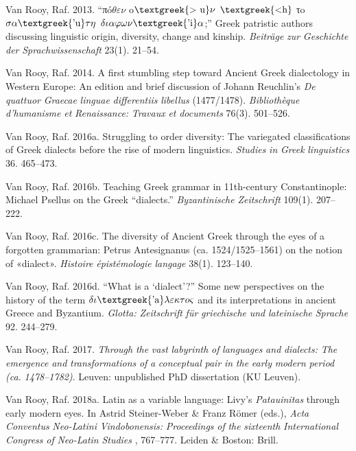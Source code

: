 Van Rooy, Raf. 2013. “πó$\theta \varepsilon \nu $ o$\text{\textgreek{>~u}}\nu $ $\text{\textgreek{<h}}$ τo$\sigma \alpha \text{\textgreek{'u}}\tau \eta $ $\delta \iota \alpha \varphi \omega \nu \text{\textgreek{'i}}\alpha $;” Greek patristic authors discussing linguistic origin, diversity, change and kinship. \textit{Beiträge} \textit{zur} \textit{Geschichte} \textit{der} \textit{Sprachwissenschaft} 23(1). 21–54.

Van Rooy, Raf. 2014. A first stumbling step toward Ancient Greek dialectology in Western Europe: An edition and brief discussion of Johann Reuchlin’s \textit{De} \textit{quattuor} \textit{Graecae} \textit{linguae} \textit{differentiis} \textit{libellus} (1477/1478). \textit{Bibliothèque} \textit{d’humanisme} \textit{et} \textit{Renaissance:} \textit{Travaux} \textit{et} \textit{documents} 76(3). 501–526.

Van Rooy, Raf. 2016a. Struggling to order diversity: The variegated classifications of Greek dialects before the rise of modern linguistics. \textit{Studies} \textit{in} \textit{Greek} \textit{linguistics} 36. 465–473.

Van Rooy, Raf. 2016b. Teaching Greek grammar in 11th-century Constantinople: Michael Psellus on the Greek “dialects.” \textit{Byzantinische} \textit{Zeitschrift} 109(1). 207–222.

Van Rooy, Raf. 2016c. The diversity of Ancient Greek through the eyes of a forgotten grammarian: Petrus Antesignanus (ca. 1524/1525–1561) on the notion of «dialect». \textit{Histoire} \textit{épistémologie} \textit{langage} 38(1). 123–140.

Van Rooy, Raf. 2016d. “What is a ‘dialect’?” Some new perspectives on the history of the term $\delta \iota \text{\textgreek{'a}}\lambda \varepsilon \kappa \tau o\varsigma $ and its interpretations in ancient Greece and Byzantium. \textit{Glotta:} \textit{Zeitschrift} \textit{für} \textit{griechische} \textit{und} \textit{lateinische} \textit{Sprache} 92. 244–279.

Van Rooy, Raf. 2017. \textit{Through} \textit{the} \textit{vast} \textit{labyrinth} \textit{of} \textit{languages} \textit{and} \textit{dialects:} \textit{The} \textit{emergence} \textit{and} \textit{transformations} \textit{of} \textit{a} \textit{conceptual} \textit{pair} \textit{in} \textit{the} \textit{early} \textit{modern} \textit{period} \textit{(ca.} \textit{1478–1782)}. Leuven: unpublished PhD dissertation (KU Leuven).

Van Rooy, Raf. 2018a. Latin as a variable language: Livy’s \textit{Patauinitas} through early modern eyes. In Astrid Steiner-Weber \& Franz Römer (eds.), \textit{Acta} \textit{Conventus} \textit{Neo-Latini} \textit{Vindobonensis:} \textit{Proceedings} \textit{of} \textit{the} \textit{sixteenth} \textit{International} \textit{Congress} \textit{of} \textit{Neo-Latin} \textit{Studies} \textit{\citep{Vienna2015}}, 767–777. Leiden \& Boston: Brill.


